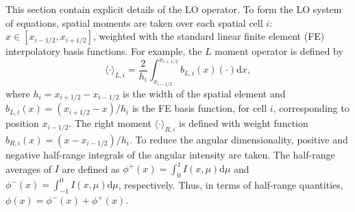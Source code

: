 \documentclass[11pt]{article}
\renewcommand{\d}{\mathrm{d}}
\newcommand{\mom}[1]{\langle #1 \rangle}
\newcommand{\xr}{{x_{i+1/2}}}
\newcommand{\il}{{i-1/2}}
\newcommand{\ir}{{i+1/2}}
\begin{document}
This section contain explicit details of the LO operator.
To form the LO system of equations, spatial moments are taken over each spatial cell $i$:
$x\in[x_{i-1/2},x_{i+1/2}]$, weighted with the standard linear finite element (FE)
interpolatory basis functions.  For example, the $L$  moment operator is defined by
\begin{equation}\label{x_mom}
\mom{\cdot}_{L,i} = \frac{2}{h_i} \int_{x_{i-1/2}}^{\xr} b_{L,i}(x) (\cdot) \d x,
\end{equation}
where $h_i=x_{i+1/2}-x_{i-1/2}$ is the width of the spatial element and
$b_{L,i}(x)=(x_{i+1/2}-x)/h_i$ is the FE basis function, for cell $i$, corresponding to position
$x_{i-1/2}$.  The right moment $\mom{\cdot}_{R,i}$ is defined with weight function $b_{R,i}(x)=(x -
x_{i-1/2})/h_i$. 
To reduce the angular dimensionality, positive and
negative half-range integrals of the angular intensity are taken.  The half-range
averages of $I$ are defined as $ \phi^+(x) = \int_0^{1} I(x,\mu) \d \mu$ and $ \phi^-(x) = \int_{-1}^{0} I(x,\mu) \d
\mu$, respectively.  Thus, in terms of half-range quantities, $\phi(x) = \phi^-(x) +
\phi ^+(x)$.  
\end{document}
